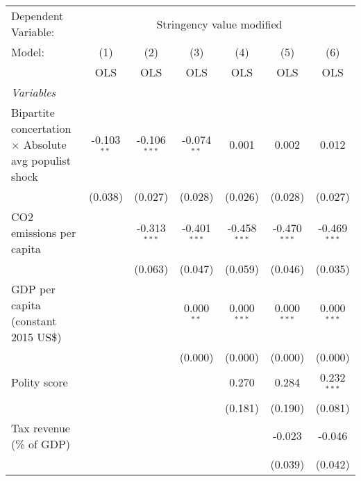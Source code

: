 
\begingroup
\centering
\begin{tabular}{lcccccc}
   \toprule
   Dependent Variable: & \multicolumn{6}{c}{Stringency value modified}\\
   Model:                                                       & (1)           & (2)            & (3)            & (4)            & (5)            & (6)\\  
                                                                &  OLS          & OLS            & OLS            & OLS            & OLS            & OLS\\  
   \midrule
   \emph{Variables}\\
   Bipartite concertation $\times$ Absolute avg populist shock  & -0.103$^{**}$ & -0.106$^{***}$ & -0.074$^{**}$  & 0.001          & 0.002          & 0.012\\   
                                                                & (0.038)       & (0.027)        & (0.028)        & (0.026)        & (0.028)        & (0.027)\\   
   CO2 emissions per capita                                     &               & -0.313$^{***}$ & -0.401$^{***}$ & -0.458$^{***}$ & -0.470$^{***}$ & -0.469$^{***}$\\   
                                                                &               & (0.063)        & (0.047)        & (0.059)        & (0.046)        & (0.035)\\   
   GDP per capita (constant 2015 US\$)                          &               &                & 0.000$^{**}$   & 0.000$^{***}$  & 0.000$^{***}$  & 0.000$^{***}$\\   
                                                                &               &                & (0.000)        & (0.000)        & (0.000)        & (0.000)\\   
   Polity score                                                 &               &                &                & 0.270          & 0.284          & 0.232$^{***}$\\   
                                                                &               &                &                & (0.181)        & (0.190)        & (0.081)\\   
   Tax revenue (\% of GDP)                                      &               &                &                &                & -0.023         & -0.046\\   
                                                                &               &                &                &                & (0.039)        & (0.042)\\   

\end{tabular}
